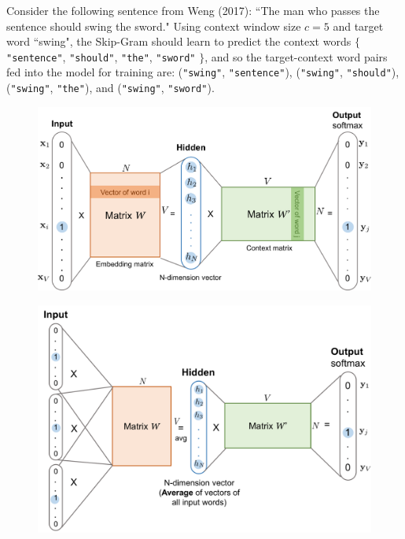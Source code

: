 Consider the following sentence from Weng (2017): ``The man who passes the sentence should swing the sword." Using context window size $c = 5$ and target word ``swing", the Skip-Gram should learn to predict the context words $\{$\texttt{"sentence"}, \texttt{"should"}, \texttt{"the"}, \texttt{"sword"} $\}$, and so the target-context word pairs fed into the model for training are: (\texttt{"swing"}, \texttt{"sentence"}), (\texttt{"swing"}, \texttt{"should"}), (\texttt{"swing"}, \texttt{"the"}), and (\texttt{"swing"}, \texttt{"sword"}).  



\begin{figure}
\centering
\begin{minipage}{.48\textwidth}
  \centering
  \includegraphics[width=\textwidth]{imgs/skipgram_image.png}
  \label{fig:SkipGram}
\end{minipage} \hspace{1.5em}%
\begin{minipage}{.48\textwidth}
  \centering
  \includegraphics[width=\textwidth]{imgs/cbow.png}

\end{minipage}
\end{figure}
